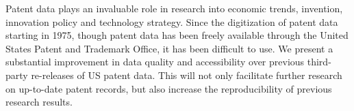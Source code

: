 Patent data plays an invaluable role in research into economic trends,
invention, innovation policy and technology strategy. Since the digitization
of patent data starting in 1975, though patent data has been freely
available through the United States Patent and Trademark Office, it
has been difficult to use. We present a substantial improvement in
data quality and accessibility over previous third-party re-releases
of US patent data. This will not only facilitate further research
on up-to-date patent records, but also increase the reproducibility
of previous research results. 
